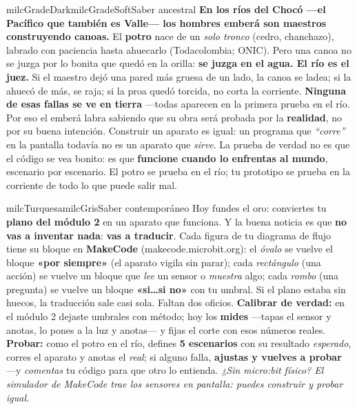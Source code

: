\documentclass[11pt,letterpaper]{article}
\begin{document}
\begin{softbox}{milcGradeDark}{milcGradeSoft}{Saber ancestral}
\textbf{En los ríos del Chocó ---el Pacífico que también es Valle--- los hombres emberá son maestros construyendo canoas.} El \textbf{potro} nace de un \emph{solo tronco} (cedro, chanchazo), labrado con paciencia hasta ahuecarlo (Todacolombia; ONIC). Pero una canoa no se juzga por lo bonita que quedó en la orilla: \textbf{se juzga en el agua. El río es el juez.} Si el maestro dejó una pared más gruesa de un lado, la canoa se ladea; si la ahuecó de más, se raja; si la proa quedó torcida, no corta la corriente. \textbf{Ninguna de esas fallas se ve en tierra} ---todas aparecen en la primera prueba en el río. Por eso el emberá labra sabiendo que su obra será probada por la \textbf{realidad}, no por su buena intención. Construir un aparato es igual: un programa que \emph{``corre''} en la pantalla todavía no es un aparato que \emph{sirve}. La prueba de verdad no es que el código se vea bonito: es que \textbf{funcione cuando lo enfrentas al mundo}, escenario por escenario. El potro se prueba en el río; tu prototipo se prueba en la corriente de todo lo que puede salir mal.
\end{softbox}

\begin{softbox}{milcTurquesa}{milcGris}{Saber contemporáneo}
Hoy fundes el oro: conviertes tu \textbf{plano del módulo 2} en un aparato que funciona. Y la buena noticia es que \textbf{no vas a inventar nada}: \textbf{vas a traducir}. Cada figura de tu diagrama de flujo tiene su bloque en \textbf{MakeCode} (makecode.microbit.org): el \emph{óvalo} se vuelve el bloque \textbf{«por siempre»} (el aparato vigila sin parar); cada \emph{rectángulo} (una acción) se vuelve un bloque que \emph{lee} un sensor o \emph{muestra} algo; cada \emph{rombo} (una pregunta) se vuelve un bloque \textbf{«si\ldots si no»} con tu umbral. Si el plano estaba sin huecos, la traducción sale casi sola. Faltan dos oficios. \textbf{Calibrar de verdad:} en el módulo 2 dejaste umbrales con método; hoy los \textbf{mides} ---tapas el sensor y anotas, lo pones a la luz y anotas--- y fijas el corte con esos números reales. \textbf{Probar:} como el potro en el río, defines \textbf{5 escenarios} con su resultado \emph{esperado}, corres el aparato y anotas el \emph{real}; si alguno falla, \textbf{ajustas y vuelves a probar} ---y \emph{comentas} tu código para que otro lo entienda. \emph{¿Sin micro:bit físico? El simulador de MakeCode trae los sensores en pantalla: puedes construir y probar igual.}
\end{softbox}
\end{document}
